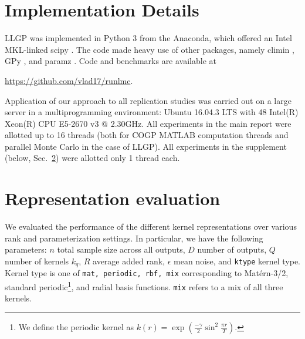 \documentclass{article}
\newif\ifanonymized
\begin{document}
\ifanonymized

\twocolumn[
\aistatstitle{Supplementary Material for Large Linear Multi-output Gaussian Process Learning}
\aistatsauthor{ Anonymous Author }
\aistatsaddress{ Anonymous Institution }
]
\else
{}
\fi


\section{Implementation Details}

LLGP was implemented in Python 3 from the Anaconda, which offered an Intel MKL-linked scipy \citep{scipy}. The code made heavy use of other packages, namely climin \citep{climin}, GPy \citep{gpy}, and paramz \citep{paramz}. Code and benchmarks are available at
\ifanonymized
\texttt{<anonymous repository>}.
\else
\url{https://github.com/vlad17/runlmc}.
\fi

Application of our approach to all replication studies was carried out on a large server in a multiprogramming environment: Ubuntu 16.04.3 LTS with 48 Intel(R) Xeon(R) CPU E5-2670 v3 @ 2.30GHz. All experiments in the main report were allotted up to 16 threads (both for COGP MATLAB computation threads and parallel Monte Carlo in the case of LLGP). All experiments in the supplement (below, Sec.~\ref{empirical-rep}) were allotted only 1 thread each.

\section{Representation evaluation}\label{empirical-rep}

We evaluated the performance of the different kernel representations over various rank and parameterization settings. In particular, we have the following parameters: $n$ total sample size across all outputs, $D$ number of outputs, $Q$ number of kernels $k_q$, $R$ average added rank, $\epsilon$ mean noise, and \texttt{ktype} kernel type. Kernel type is one of \texttt{mat, periodic, rbf, mix} corresponding to Mat\'{e}rn-3/2, standard periodic\footnote{We define the periodic kernel as $k(r) = \exp \left(\frac{-\gamma}{2}\sin^2\frac{\pi r}{T}\right)$.}, and radial basis functions. \texttt{mix} refers to a mix of all three kernels.
\end{document}
